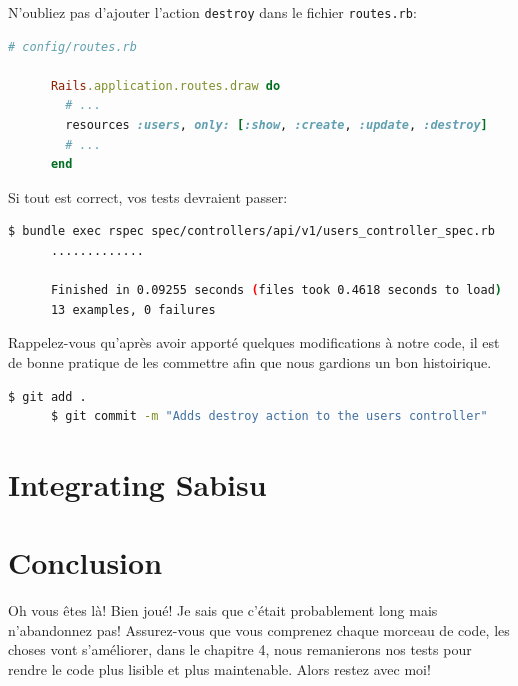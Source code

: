 \documentclass[]{report}
\begin{document}
      N'oubliez pas d'ajouter l'action \verb|destroy| dans le fichier \verb|routes.rb|:

      \begin{scriptsize}
      \begin{lstlisting}[language=ruby]
      # config/routes.rb

      Rails.application.routes.draw do
        # ...
        resources :users, only: [:show, :create, :update, :destroy]
        # ...
      end
      \end{lstlisting}
      \end{scriptsize}

      Si tout est correct, vos tests devraient passer:

      \begin{scriptsize}
      \begin{lstlisting}[language=bash]
      $ bundle exec rspec spec/controllers/api/v1/users_controller_spec.rb
      .............

      Finished in 0.09255 seconds (files took 0.4618 seconds to load)
      13 examples, 0 failures
      \end{lstlisting}
      \end{scriptsize}

      Rappelez-vous qu'après avoir apporté quelques modifications à notre code, il est de bonne pratique de les commettre afin que nous gardions un bon histoirique.

      \begin{scriptsize}
      \begin{lstlisting}[language=bash]
      $ git add .
      $ git commit -m "Adds destroy action to the users controller"
      \end{lstlisting}
      \end{scriptsize}

  \section{Integrating Sabisu}


  \section{Conclusion}

    Oh vous êtes là! Bien joué! Je sais que c'était probablement  long mais n'abandonnez pas! Assurez-vous que vous comprenez chaque morceau de code, les choses vont s'améliorer, dans le chapitre 4, nous remanierons nos tests pour rendre le code plus lisible et plus maintenable. Alors restez avec moi!
\end{document}
